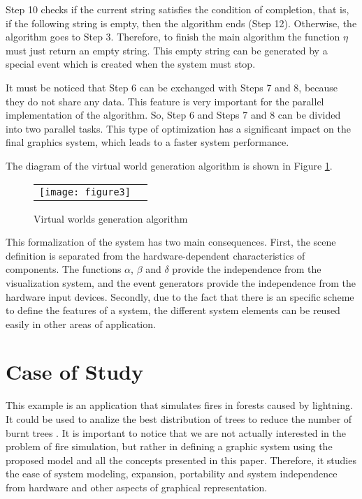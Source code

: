 \documentclass[10pt,journal,letterpaper,compsoc]{IEEEtran}
\begin{document}
Step 10 checks if the current string satisfies the condition of completion, that is, if the
following string is empty, then the algorithm ends (Step 12). Otherwise, the algorithm goes to Step
3. Therefore, to finish the main algorithm the function $\eta$ must just return an empty string.
This empty string can be generated by a special event which is created when the system must stop.

It must be noticed that Step 6 can be exchanged with Steps 7 and 8, because they do not share any
data. This feature is very important for the parallel implementation of the algorithm.  So, Step 6
and Steps 7 and 8 can be divided into two parallel tasks. This type of optimization has a
significant impact on the final graphics system, which leads to a faster system performance.

The diagram of the virtual world generation algorithm is shown in Figure \ref{fig:diagram}.



\begin{figure}[htb]
    \centering
    \begin{tabular}{cc}
       \texttt{[image: figure3]}
    \end{tabular}
    \caption{\label{fig:diagram} Virtual worlds generation algorithm}
\end{figure}


This formalization of the system has two main consequences. First, the scene definition is
separated from the hardware-dependent characteristics of components. The functions $\alpha$,
$\beta$ and $\delta$ provide the independence from the visualization system, and the event
generators provide the independence from the hardware input devices. Secondly, due to the fact that
there is an specific scheme to define the features of a system, the different system elements can be
reused easily in other areas of application.



\section{Case of Study
\label{sec:case_study}}

This example is an application that simulates fires in forests caused by lightning. It could
be used to analize the best distribution of trees to reduce the number of burnt trees
\cite{John2007}. It is important to notice that we are not actually interested in the problem of fire simulation,
but rather in defining a graphic system using the proposed model and all the concepts presented in
this paper. Therefore, it studies the ease of system modeling, expansion, portability and system
independence from hardware and other aspects of graphical representation.
\end{document}
